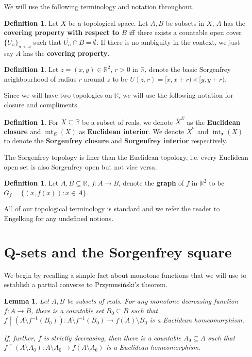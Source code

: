 \documentclass[11pt]{amsart}
\newtheorem{lemma}[theorem]{Lemma}
\theoremstyle{definition}
\newtheorem{definition}[theorem]{Definition}
\theoremstyle{remark}
\newcommand{\R}{\mathbb{R}}
\DeclareMathOperator{\interior}{int}
\theoremstyle{plain}
\begin{document}

We will use the following terminology and notation throughout. 
\begin{definition}
    Let $X$ be a topological space. Let $A,B$ be subsets in $X$, $A$ has the \textbf{covering property with respect to $B$} iff there exists a countable open cover $\{U_n\}_{n<\omega}$ such that $\overline{U_n}\cap B=\emptyset$. If there is no ambiguity in the context, we just say $A$ has the \textbf{covering property}.
\end{definition}
\begin{definition}
    Let $z=(x,y)\in \R^2$, $r>0$ in $\R$, denote the basic Sorgenfrey neighbourhood of radius $r$ around $z$ to be $U(z,r)= [x,x+r)\times[y,y+r)$.
\end{definition}
Since we will have two topologies on $\R$, we will use the following notation for closure and compliments.
\begin{definition}
    For $X\subseteq \R$ be a subset of reals, we denote $\overline{X}^E$ as the \textbf{Euclidean closure} and $\interior_E(X)$ as \textbf{Euclidean interior}. We denote $\overline{X}^{\sigma}$ and $\interior_\sigma(X)$ to denote the \textbf{Sorgenfrey closure} and \textbf{Sorgenfrey interior} respectively. 
\end{definition}
 The Sorgenfrey topology is finer than the Euclidean topology, i.e. every Euclidean open set is also Sorgenfrey open but not vice versa.

\begin{definition}
    Let $A,B\subseteq \R$, $f:A\to B$, denote the \textbf{graph} of $f$ in $\R^2$ to be $G_f=\{ (x,f(x)):x\in A\}$.
\end{definition}

All of our topological terminology is standard and we refer the reader to Engelking \cite{engelking1989general} for any undefined notions. 

\section{Q-sets and the Sorgenfrey square}

We begin by recalling a simple fact about monotone functions that we will use to establish a partial converse to Przymusi\'nski's theorem. 
\begin{lemma}\label{lem:homeo}
    Let $A,B$ be subsets of reals. For any monotone decreasing function $f:A\to B$, there is a countable set $B_0\subseteq B$ such that $f\upharpoonright (A\setminus f^{-1}(B_0)): A\setminus f^{-1}(B_0) \to f(A)\setminus B_0$ is a Euclidean homeomorphism.
    
    If, further, $f$ is strictly decreasing, then there is a countable $A_0\subseteq A$ such that $f\upharpoonright (A\setminus A_0):A\setminus A_0\rightarrow f(A\setminus A_0)$ is a Euclidean homeomorphism. \\
\end{lemma}
\end{document}
